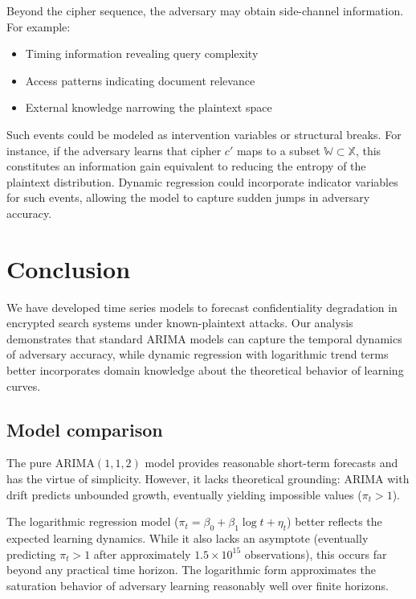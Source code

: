 \documentclass[final,11pt]{article}
\newcommand{\set}[1]{\mathbb{#1}}
\theoremstyle{plain}
\theoremstyle{remark}
\begin{document}
Beyond the cipher sequence, the adversary may obtain side-channel
information. For example:
\begin{itemize}
\item Timing information revealing query complexity
\item Access patterns indicating document relevance
\item External knowledge narrowing the plaintext space
\end{itemize}

Such events could be modeled as intervention variables or structural
breaks. For instance, if the adversary learns that cipher $c'$ maps to
a subset $\set{W} \subset \set{X}$, this constitutes an information gain
equivalent to reducing the entropy of the plaintext distribution. Dynamic
regression could incorporate indicator variables for such events, allowing
the model to capture sudden jumps in adversary accuracy.

\hypertarget{conclusion}{%
\section{Conclusion}\label{conclusion}}

We have developed time series models to forecast confidentiality
degradation in encrypted search systems under known-plaintext attacks.
Our analysis demonstrates that standard ARIMA models can capture the
temporal dynamics of adversary accuracy, while dynamic regression with
logarithmic trend terms better incorporates domain knowledge about the
theoretical behavior of learning curves.

\subsection{Model comparison}

The pure ARIMA$(1,1,2)$ model provides reasonable short-term forecasts
and has the virtue of simplicity. However, it lacks theoretical grounding:
ARIMA with drift predicts unbounded growth, eventually yielding
impossible values ($\pi_t > 1$).

The logarithmic regression model ($\pi_t = \beta_0 + \beta_1 \log t +
\eta_t$) better reflects the expected learning dynamics. While it also
lacks an asymptote (eventually predicting $\pi_t > 1$ after approximately
$1.5 \times 10^{15}$ observations), this occurs far beyond any practical
time horizon. The logarithmic form approximates the saturation behavior
of adversary learning reasonably well over finite horizons.
\end{document}
